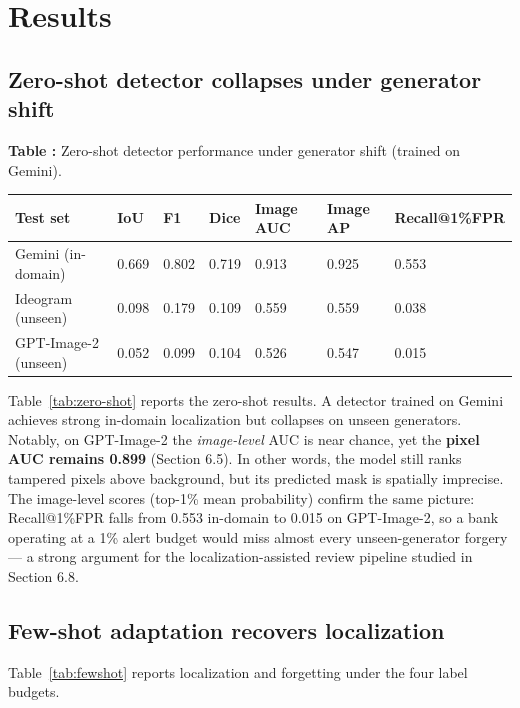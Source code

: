 \documentclass[preprint,12pt]{elsarticle}
\newcounter{tabno}
\newcommand{\tabcaption}[1]{\par\needspace{9\baselineskip}\refstepcounter{tabno}\noindent\textbf{Table \thetabno:} #1\par\vspace{2pt}}
\begin{document}
\bigskip

\section{Results}\label{results}

\subsection{Zero-shot detector collapses under generator shift}\label{zero-shot-detector-collapses-under-generator-shift}

{
\tabcaption{Zero-shot detector performance under generator shift (trained on Gemini).}\label{tab:zero-shot}
\begin{longtable}[]{@{}lllllll@{}}
\toprule\noalign{}
Test set & IoU & F1 & Dice & Image AUC & Image AP & Recall@1\%FPR \\
\midrule\noalign{}
\endhead
\bottomrule\noalign{}
\endlastfoot
Gemini (in-domain) & 0.669 & 0.802 & 0.719 & 0.913 & 0.925 & 0.553 \\
Ideogram (unseen) & 0.098 & 0.179 & 0.109 & 0.559 & 0.559 & 0.038 \\
GPT-Image-2 (unseen) & 0.052 & 0.099 & 0.104 & 0.526 & 0.547 & 0.015 \\
\end{longtable}
}

Table~\ref{tab:zero-shot} reports the zero-shot results. A detector trained on Gemini achieves strong in-domain localization but collapses on unseen generators. Notably, on GPT-Image-2 the \emph{image-level} AUC is near chance, yet the \textbf{pixel AUC remains 0.899} (Section 6.5). In other words, the model still ranks tampered pixels above background, but its predicted mask is spatially imprecise. The image-level scores (top-1\% mean probability) confirm the same picture: Recall@1\%FPR falls from 0.553 in-domain to 0.015 on GPT-Image-2, so a bank operating at a 1\% alert budget would miss almost every unseen-generator forgery --- a strong argument for the localization-assisted review pipeline studied in Section 6.8.

\subsection{Few-shot adaptation recovers localization}\label{few-shot-adaptation-recovers-localization}

Table~\ref{tab:fewshot} reports localization and forgetting under the four label budgets.
\end{document}
